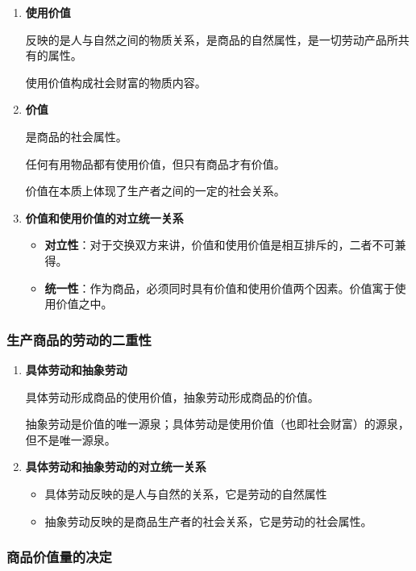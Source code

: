 \documentclass[12pt, a4paper, oneside]{ctexart}
\begin{document}
\begin{enumerate}
  \item {\bf 使用价值}
  
  反映的是人与自然之间的物质关系，是商品的自然属性，是一切劳动产品所共有的属性。

  使用价值构成社会财富的物质内容。

  \item {\bf 价值}
  
  是商品的社会属性。

  任何有用物品都有使用价值，但只有商品才有价值。

  价值在本质上体现了生产者之间的一定的社会关系。

  \item {\bf 价值和使用价值的对立统一关系}
  
  \begin{itemize}
    \item {\bf 对立性}：对于交换双方来讲，价值和使用价值是相互排斥的，二者不可兼得。
    \item {\bf 统一性}：作为商品，必须同时具有价值和使用价值两个因素。价值寓于使用价值之中。
  \end{itemize}
\end{enumerate}

\subsubsection{生产商品的劳动的二重性}

\begin{enumerate}
  \item {\bf 具体劳动和抽象劳动}
  
  具体劳动形成商品的使用价值，抽象劳动形成商品的价值。

  抽象劳动是价值的唯一源泉；具体劳动是使用价值（也即社会财富）的源泉，但不是唯一源泉。

  \item {\bf 具体劳动和抽象劳动的对立统一关系}
  
  \begin{itemize}
    \item 具体劳动反映的是人与自然的关系，它是劳动的自然属性
    \item 抽象劳动反映的是商品生产者的社会关系，它是劳动的社会属性。
  \end{itemize}
\end{enumerate}

\subsubsection{商品价值量的决定}
\end{document}
